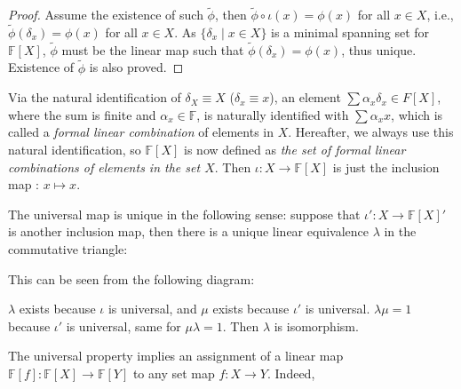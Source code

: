 \documentclass[
	11pt, %
	fleqn, %
	a4paper, %
]{LegrandOrangeBook}
\newcommand{\F}{\mathbb{F}} %
\begin{document}
\begin{proof}
    Assume the existence of such $\tilde{\phi}$, then $\tilde{\phi} \circ \iota (x) = \phi(x)$ for all $x \in X$, i.e., $\tilde{\phi} (\delta_x) = \phi(x)$ for all $x \in X$. As $\{ \delta_x \mid x \in X \}$ is a minimal spanning set for $\F[X]$, $\tilde{\phi}$ must be the linear map such that $\tilde{\phi} (\delta_x) = \phi(x)$, thus unique. Existence of $\tilde{\phi}$ is also proved.
\end{proof}

Via the natural identification of $\delta_X \equiv X$ ($\delta_x \equiv x$), an element $\sum \alpha_x \delta_x \in F[X]$, where the sum is finite and $\alpha_x \in \F$, is naturally identified with $\sum \alpha_x x$, which is called a \emph{formal linear combination} of elements in $X$. Hereafter, we always use this natural identification, so $\F[X]$ is now defined as \emph{the set of formal linear combinations of elements in the set $X$}. Then $\iota : X \to \F[X]$ is just the inclusion map : $x \mapsto x$.

The universal map is unique in the following sense: suppose that $\iota' : X \to \F[X]'$ is another inclusion map, then there is a unique linear equivalence $\lambda$ in the commutative triangle:
\begin{center}
\end{center}

This can be seen from the following diagram:
\begin{center}
\end{center}
$\lambda$ exists because $\iota$ is universal, and $\mu$ exists because $\iota'$ is universal. $\lambda \mu = 1$ because $\iota'$ is universal, same for $\mu \lambda = 1$. Then $\lambda$ is isomorphism.

The universal property implies an assignment of a linear map $\F[f] : \F[X] \to \F[Y]$ to any set map $f : X \to Y$. Indeed,
\begin{center}
\end{center}
\end{document}
